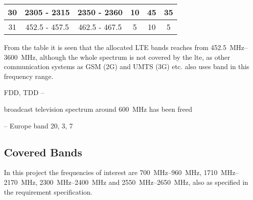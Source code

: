 \begin{table}[]
\begin{tabular}{|c|c|c|c|c|c|}
30                                                          & 2305 - 2315                                            & 2350 - 2360                                              & 10                                                                   & 45                                                               & 35                                                          \\ \hline
31                                                          & 452.5 - 457.5                                          & 462.5 - 467.5                                            & 5                                                                    & 10                                                               & 5                                                           \\ \hline
\end{tabular}
\end{table}

From the table it is seen that the allocated LTE bands reaches from \SIrange{452.5}{3600}{MHz}, although the whole spectrum is not covered by the lte, as other communication systems as GSM (2G) and UMTS (3G) etc. also uses band in this frequency range.  

FDD, TDD -- 

broadcast television spectrum around \SI{600}{MHz} has been freed
\cite{Samantha2015tunableAntennas}

 -- Europe band 20, 3, 7 


\subsection{Covered Bands}
In this project the frequencies of interest are \SIrange{700}{960}{MHz}, \SIrange{1710}{2170}{MHz}, \SIrange{2300}{2400}{MHz} and \SIrange{2550}{2650}{MHz}, also as specified in the requirement specification.

